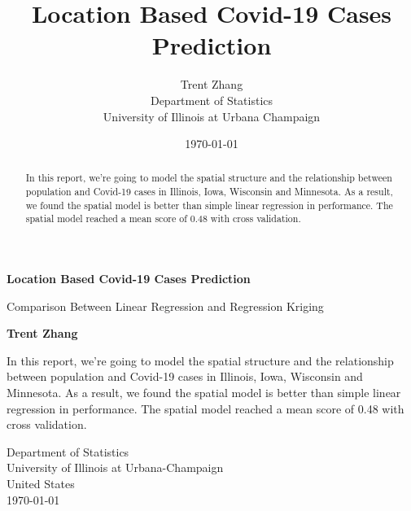 \documentclass{article}
\title{Location Based Covid-19 Cases Prediction}
\author{Trent Zhang  \\
	Department of Statistics \\
    University of Illinois at Urbana Champaign  \\
	}
\date{\today}
\begin{document}
\begin{titlepage}
    \begin{center}
        \vspace*{1cm}

        \textbf{Location Based Covid-19 Cases Prediction}

        \vspace{0.5cm}
        Comparison Between Linear Regression and Regression Kriging

        \vspace{1.5cm}

        \textbf{Trent Zhang}
        \vspace{1.5cm}

        \begin{minipage}{30em}
            In this report, we're going to model the spatial structure and the relationship between population and Covid-19 cases in Illinois, Iowa, Wisconsin and Minnesota. As a result, we found the spatial model is better than simple linear regression in performance. The spatial model reached a mean score of 0.48 with cross validation.
        \end{minipage}
        \vfill
        \vspace{0.8cm}

        Department of Statistics\\
        University of Illinois at Urbana-Champaign\\
        United States\\
        \today

    \end{center}
\end{titlepage}


\maketitle


\begin{abstract}
    In this report, we're going to model the spatial structure and the relationship between population and Covid-19 cases in Illinois, Iowa, Wisconsin and Minnesota. As a result, we found the spatial model is better than simple linear regression in performance. The spatial model reached a mean score of 0.48 with cross validation.
\end{abstract}
\end{document}
